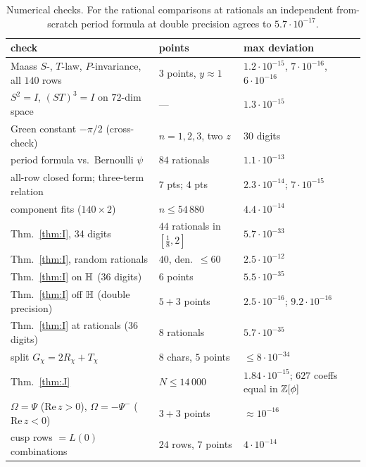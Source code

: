 \begin{table}[ht]\centering\small
\begin{tabular}{p{6.4cm}p{4.0cm}p{4.0cm}}\toprule
check & points & max deviation\\\midrule
Maass $S$-, $T$-law, $P$-invariance, all $140$ rows & 3 points, $y\approx1$ & $1.2\cdot10^{-15}$, $7\cdot10^{-16}$, $6\cdot10^{-16}$\\
$S^2=I$, $(ST)^3=I$ on $72$-dim space & --- & $1.3\cdot10^{-15}$\\
Green constant $-\pi/2$ (cross-check) & $n=1,2,3$, two $z$ & 30 digits\\
period formula vs.\ Bernoulli $\psi$ & $84$ rationals & $1.1\cdot10^{-13}$\\
all-row closed form; three-term relation & $7$ pts; $4$ pts & $2.3\cdot10^{-14}$; $7\cdot10^{-15}$\\
component fits ($140\times2$) & $n\le54\,880$ & $4.4\cdot10^{-14}$\\
Thm.~\ref{thm:I}, 34 digits & $44$ rationals in $[\tfrac18,2]$ & $5.7\cdot10^{-33}$\\
Thm.~\ref{thm:I}, random rationals & $40$, den.\ $\le60$ & $2.5\cdot10^{-12}$\\
Thm.~\ref{thm:I} on $\mathbb{H}$ (36 digits) & $6$ points & $5.5\cdot10^{-35}$\\
Thm.~\ref{thm:I} off $\mathbb{H}$ (double precision) & $5+3$ points & $2.5\cdot10^{-16}$; $9.2\cdot10^{-16}$\\
Thm.~\ref{thm:I} at rationals (36 digits) & $8$ rationals & $5.7\cdot10^{-35}$\\
split $G_\chi=2R_\chi+T_\chi$ & $8$ chars, $5$ points & $\le8\cdot10^{-34}$\\
Thm.~\ref{thm:J} & $N\le14\,000$ & $1.84\cdot10^{-15}$; $627$ coeffs equal in $\mathbb{Z}[\phi]$\\
$\Omega=\Psi$ ($\mathrm{Re}\,z>0$), $\Omega=-\Psi^-$ ($\mathrm{Re}\,z<0$) & $3+3$ points & $\approx10^{-16}$\\
cusp rows $=L(0)$ combinations & $24$ rows, $7$ points & $4\cdot10^{-14}$\\\bottomrule
\end{tabular}
\caption{Numerical checks. For the rational comparisons at rationals an independent from-scratch period formula at double precision agrees to $5.7\cdot10^{-17}$.}
\end{table}

